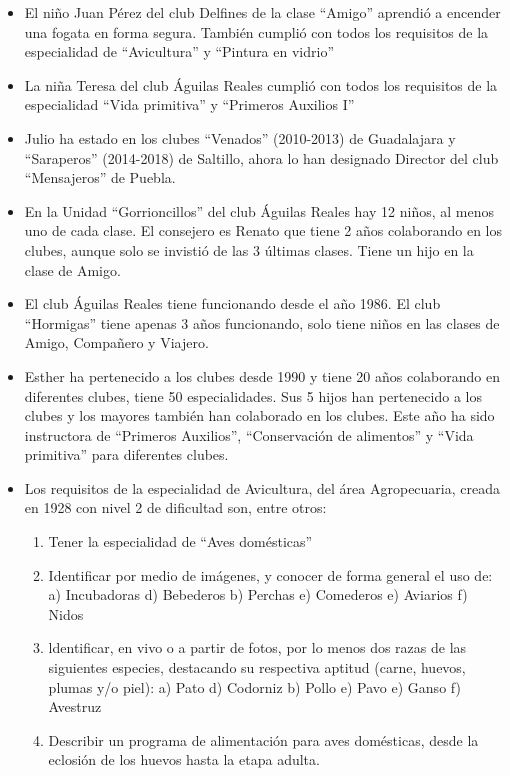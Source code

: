 \documentclass[
  letterpaper,
  DIV=11,
  numbers=noendperiod]{scrreprt}
\providecommand{\tightlist}{%
  \setlength{\itemsep}{0pt}\setlength{\parskip}{0pt}}\usepackage{longtable,booktabs,array}
\begin{document}
\begin{itemize}
\tightlist
\item
  El niño Juan Pérez del club Delfines de la clase ``Amigo'' aprendió a
  encender una fogata en forma segura. También cumplió con todos los
  requisitos de la especialidad de ``Avicultura'' y ``Pintura en
  vidrio''
\item
  La niña Teresa del club Águilas Reales cumplió con todos los
  requisitos de la especialidad ``Vida primitiva'' y ``Primeros Auxilios
  I''
\item
  Julio ha estado en los clubes ``Venados'' (2010-2013) de Guadalajara y
  ``Saraperos'' (2014-2018) de Saltillo, ahora lo han designado Director
  del club ``Mensajeros'' de Puebla.
\item
  En la Unidad ``Gorrioncillos'' del club Águilas Reales hay 12 niños,
  al menos uno de cada clase. El consejero es Renato que tiene 2 años
  colaborando en los clubes, aunque solo se invistió de las 3 últimas
  clases. Tiene un hijo en la clase de Amigo.
\item
  El club Águilas Reales tiene funcionando desde el año 1986. El club
  ``Hormigas'' tiene apenas 3 años funcionando, solo tiene niños en las
  clases de Amigo, Compañero y Viajero.
\item
  Esther ha pertenecido a los clubes desde 1990 y tiene 20 años
  colaborando en diferentes clubes, tiene 50 especialidades. Sus 5 hijos
  han pertenecido a los clubes y los mayores también han colaborado en
  los clubes. Este año ha sido instructora de ``Primeros Auxilios'',
  ``Conservación de alimentos'' y ``Vida primitiva'' para diferentes
  clubes.
\item
  Los requisitos de la especialidad de Avicultura, del área
  Agropecuaria, creada en 1928 con nivel 2 de dificultad son, entre
  otros:

  \begin{enumerate}
  \def\labelenumi{\arabic{enumi}.}
  \tightlist
  \item
    Tener la especialidad de ``Aves domésticas''
  \item
    Identificar por medio de imágenes, y conocer de forma general el uso
    de: a) Incubadoras d) Bebederos b) Perchas e) Comederos e) Aviarios
    f) Nidos
  \item
    ldentificar, en vivo o a partir de fotos, por lo menos dos razas de
    las siguientes especies, destacando su respectiva aptitud (carne,
    huevos, plumas y/o piel): a) Pato d) Codorniz b) Pollo e) Pavo e)
    Ganso f) Avestruz
  \item
    Describir un programa de alimentación para aves domésticas, desde la
    eclosión de los huevos hasta la etapa adulta.
  \end{enumerate}
\end{itemize}
\end{document}

